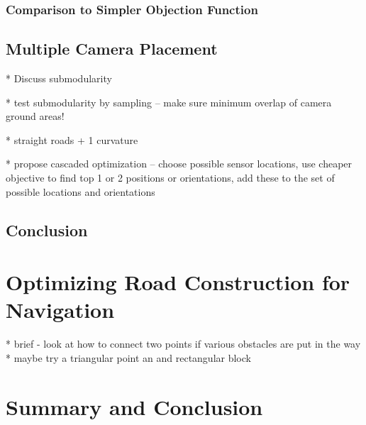 \documentclass[a4paper,12pt,twoside,openright]{report}
\begin{document}
\subsection{Comparison to Simpler Objection Function}



\section{Multiple Camera Placement}
* Discuss submodularity

* test submodularity by sampling -- make sure minimum overlap of camera ground areas!

* straight roads + 1 curvature

* propose cascaded optimization -- choose possible sensor locations, use cheaper objective to find top 1 or 2 
positions or orientations, add these to the set of possible locations and orientations



\section{Conclusion}

\chapter{Optimizing Road Construction for Navigation}

* brief - look at how to connect two points if various obstacles are put in the way
* maybe try a triangular point an and rectangular block 


\chapter{Summary and Conclusion} 




\appendix
\singlespacing

\end{document}
